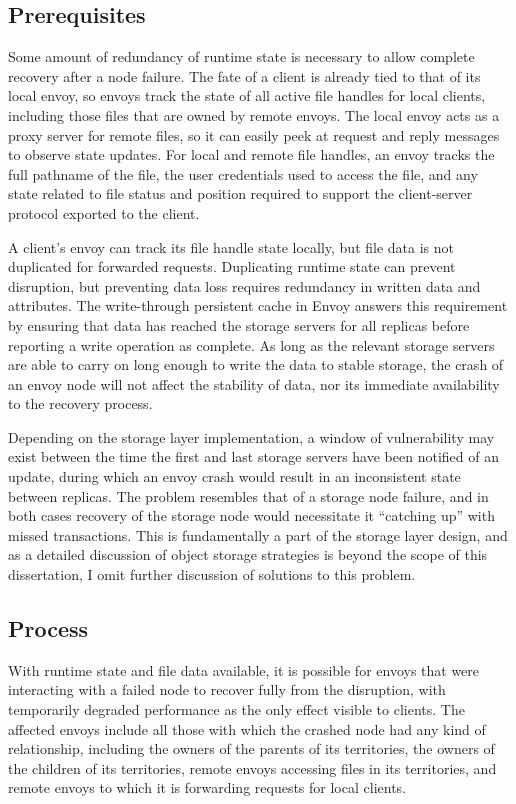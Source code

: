 \subsection{Prerequisites}

Some amount of redundancy of runtime state is necessary to allow complete recovery after a node failure. The fate of a client is already tied to that of its local envoy, so envoys track the state of all active file handles for local clients, including those files that are owned by remote envoys. The local envoy acts as a proxy server for remote files, so it can easily peek at request and reply messages to observe state updates. For local and remote file handles, an envoy tracks the full pathname of the file, the user credentials used to access the file, and any state related to file status and position required to support the client-server protocol exported to the client.

A client's envoy can track its file handle state locally, but file data is not duplicated for forwarded requests. Duplicating runtime state can prevent disruption, but preventing data loss requires redundancy in written data and attributes. The write-through persistent cache in Envoy answers this requirement by ensuring that data has reached the storage servers for all replicas before reporting a write operation as complete. As long as the relevant storage servers are able to carry on long enough to write the data to stable storage, the crash of an envoy node will not affect the stability of data, nor its immediate availability to the recovery process.

Depending on the storage layer implementation, a window of vulnerability may exist between the time the first and last storage servers have been notified of an update, during which an envoy crash would result in an inconsistent state between replicas. The problem resembles that of a storage node failure, and in both cases recovery of the storage node would necessitate it ``catching up'' with missed transactions. This is fundamentally a part of the storage layer design, and as a detailed discussion of object storage strategies is beyond the scope of this dissertation, I omit further discussion of solutions to this problem.

\subsection{Process}

With runtime state and file data available, it is possible for envoys that were interacting with a failed node to recover fully from the disruption, with temporarily degraded performance as the only effect visible to clients. The affected envoys include all those with which the crashed node had any kind of relationship, including the owners of the parents of its territories, the owners of the children of its territories, remote envoys accessing files in its territories, and remote envoys to which it is forwarding requests for local clients.

